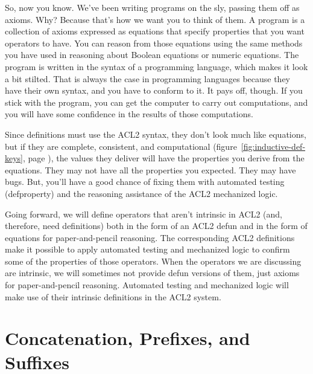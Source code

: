 So, now you
know.
We've been writing programs on the sly, passing them off as axioms.
Why? Because that's how we want you to think of them.
A program is a collection of axioms expressed as equations
that specify properties that you want operators to have.
You can reason from those equations using the same methods
you have used in reasoning about Boolean equations or numeric equations.
The program is written in the syntax of a programming language,
which makes it look a bit stilted.
That is always the case in programming languages because
they have their own syntax, and you have to conform to it.
It pays off, though.
If you stick with the program, you can get the computer to carry out
computations, and you will have some confidence in the results
of those computations.

Since definitions must use the ACL2 syntax,
they don't look much like equations, %
but if they are complete, consistent, and computational
(figure~\ref{fig:inductive-def-keys}, page \pageref{fig:inductive-def-keys}),
the values they deliver will have the properties you derive
from the equations.
They may not have all the properties you expected.
They may have bugs.
But, you'll have a good chance of fixing them with %
automated testing (\textsf{defproperty})
and the reasoning assistance of the ACL2 mechanized logic.

Going forward, we will define operators that aren't %
intrinsic in ACL2 (and, therefore, need definitions)
both in the form of an ACL2 \textsf{defun}
and in the form of equations for paper-and-pencil reasoning.
The corresponding ACL2 definitions
make it possible to apply automated testing and mechanized logic
to confirm some of the properties of those operators.
When the operators we are discussing are intrinsic,
we will sometimes not provide \textsf{defun} versions of them,
just axioms for paper-and-pencil reasoning.
Automated testing and mechanized logic will make use
of their intrinsic definitions in the ACL2 system.

\section{Concatenation, Prefixes, and Suffixes}
\label{sec:append-prefix-suffix}

